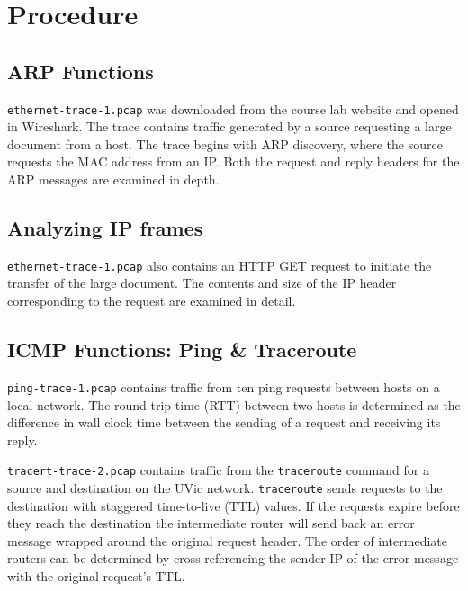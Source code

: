 \section{Procedure}\label{sec:procedure}
\subsection{ARP Functions}
\texttt{ethernet-trace-1.pcap} was downloaded from the course lab website and opened in Wireshark. The trace contains traffic generated by a source requesting a large document from a host. The trace begins with ARP discovery, where the source requests the MAC address from an IP. Both the request and reply headers for the ARP messages are examined in depth.

\subsection{Analyzing IP frames}
\texttt{ethernet-trace-1.pcap} also contains an HTTP GET request to initiate the transfer of the large document. The contents and size of the IP header corresponding to the request are examined in detail.

\subsection{ICMP Functions: Ping \& Traceroute}
\texttt{ping-trace-1.pcap} contains traffic from ten ping requests between hosts on a local network. The round trip time (RTT) between two hosts is determined as the difference in wall clock time between the sending of a request and receiving its reply.

\texttt{tracert-trace-2.pcap} contains traffic from the \texttt{traceroute} command for a source and destination on the UVic network. \texttt{traceroute} sends requests to the destination with staggered time-to-live (TTL) values. If the requests expire before they reach the destination the intermediate router will send back an error message wrapped around the original request header. The order of intermediate routers can be determined by cross-referencing the sender IP of the error message with the original request's TTL.
